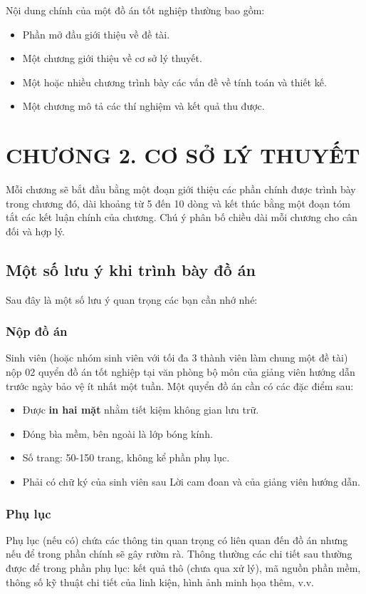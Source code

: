\documentclass{article} %
\begin{document}
Nội dung chính của một đồ án tốt nghiệp thường bao gồm:
\begin{itemize}[itemsep=6pt]
    \item Phần mở đầu giới thiệu về đề tài.
    \item Một chương giới thiệu về cơ sở lý thuyết.
    \item Một hoặc nhiều chương trình bày các vấn đề về tính toán và thiết kế.
    \item Một chương mô tả các thí nghiệm và kết quả thu được.
\end{itemize}
\cleardoublepage
\section*{\centering  CHƯƠNG 2. CƠ SỞ LÝ THUYẾT}
\setcounter{section}{2}
\setcounter{subsection}{0}
\setcounter{figure}{0}
\setcounter{table}{0}
 {}
Mỗi chương sẽ bắt đầu bằng một đoạn giới thiệu các phần chính được trình bày trong chương đó, dài khoảng từ 5 đến 10 dòng và kết thúc bằng một đoạn tóm tắt các kết luận chính của chương. Chú ý phân bố chiều dài mỗi chương cho cân đối và hợp lý.
\subsection{Một số lưu ý khi trình bày đồ án}
Sau đây là một số lưu ý quan trọng các bạn cần nhớ nhé:
\subsubsection{Nộp đồ án}
Sinh viên (hoặc nhóm sinh viên với tối đa 3 thành viên làm chung một đề tài) nộp 02 quyển đồ án tốt nghiệp tại văn phòng bộ môn của giảng viên hướng dẫn trước ngày bảo vệ ít nhất một tuần. Một quyển đồ án cần có các đặc điểm sau:
\begin{itemize}[itemsep=6pt]
    \item Được \textbf{in hai mặt} nhằm tiết kiệm không gian lưu trữ.
    \item Đóng bìa mềm, bên ngoài là lớp bóng kính.
    \item Số trang: 50-150 trang, không kể phần phụ lục.
    \item Phải có chữ ký của sinh viên sau Lời cam đoan và của giảng viên hướng dẫn.
\end{itemize}
\subsubsection{Phụ lục}
Phụ lục (nếu có) chứa các thông tin quan trọng có liên quan đến đồ án nhưng nếu để trong phần chính sẽ gây rườm rà. Thông thường các chi tiết sau thường được để trong phần phụ lục: kết quả thô (chưa qua xử lý), mã nguồn phần mềm, thông số kỹ thuật chi tiết của linh kiện, hình ảnh minh họa thêm, v.v.
\end{document}
